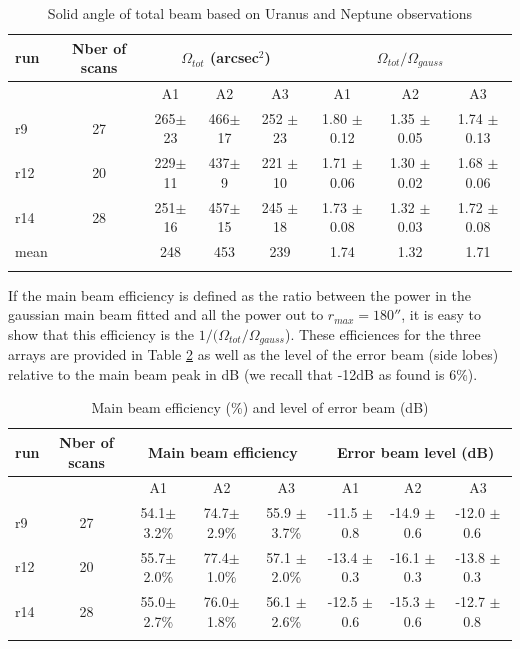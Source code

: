 \begin{table}[!h]
\caption{Solid angle of total beam based on Uranus and Neptune observations}
\label{tab:solid}
\centering
\begin{tabular}{l| c | c c c | c c c}
\hline\hline
\noalign{\smallskip}
run  & Nber of scans & \multicolumn{3}{c}{$\Omega_{tot}$ (arcsec$^{2}$)} & \multicolumn{3}{c}{$\Omega_{tot}/\Omega_{gauss}$} \\
\hline
     &               &  A1    &    A2   &  A3  & A1  &  A2  & A3   \\
            \hline
r9    & 27  &  265$\pm$ 23    &  466$\pm$ 17 & 252 $\pm$ 23 &  1.80 $\pm$ 0.12    &  1.35 $\pm$ 0.05   &   1.74 $\pm$ 0.13   \\
r12   & 20  &  229$\pm$ 11    &  437$\pm$  9 & 221 $\pm$ 10 &  1.71 $\pm$ 0.06   &  1.30 $\pm$ 0.02   &   1.68 $\pm$ 0.06   \\
r14   & 28  &  251$\pm$ 16    &  457$\pm$ 15 & 245 $\pm$ 18 &  1.73 $\pm$ 0.08   &  1.32 $\pm$ 0.03   &   1.72 $\pm$ 0.08   \\
mean  &     &  248            &  453         &  239         &  1.74              &   1.32             &   1.71              \\
       \noalign{\smallskip}
            \hline
\end{tabular}
\end{table}


If the main beam efficiency is defined as the ratio between the power in the gaussian main beam fitted and
all the power out to $r_{max}=180''$, it is easy to show that this efficiency is the $ 1 / (\Omega_{tot}/\Omega_{gauss}$).
These efficiences for the three arrays are provided in Table \ref{tab:MB} as well as the level of the error beam (side lobes)
relative to the main beam peak in dB (we recall that -12dB as found is 6\%).

\begin{table}[!h]
\caption{Main beam efficiency (\%) and level of error beam (dB)}
\label{tab:MB}
\centering
\begin{tabular}{l| c | c c c | c c c}
\hline\hline
\noalign{\smallskip}
run  & Nber of scans & \multicolumn{3}{c}{Main beam efficiency } & \multicolumn{3}{c}{Error beam level (dB)} \\
\hline
     &               &  A1    &    A2   &  A3  & A1  &  A2  & A3   \\
            \hline
r9    & 27  &  54.1$\pm$ 3.2\%    &  74.7$\pm$ 2.9\% & 55.9 $\pm$ 3.7\%   &  -11.5 $\pm$ 0.8    &  -14.9 $\pm$ 0.6   &  -12.0 $\pm$ 0.6  \
 \\
r12   & 20  &  55.7$\pm$ 2.0\%    &  77.4$\pm$ 1.0\% & 57.1 $\pm$ 2.0\%   &  -13.4 $\pm$ 0.3    &  -16.1 $\pm$ 0.3   &  -13.8 $\pm$ 0.3  \
 \\
r14   & 28  &  55.0$\pm$ 2.7\%    &  76.0$\pm$ 1.8\% & 56.1 $\pm$ 2.6\%   &  -12.5 $\pm$ 0.6    &  -15.3 $\pm$ 0.6   &  -12.7 $\pm$ 0.8  \
 \\
            \noalign{\smallskip}
            \hline
\end{tabular}
\end{table}







